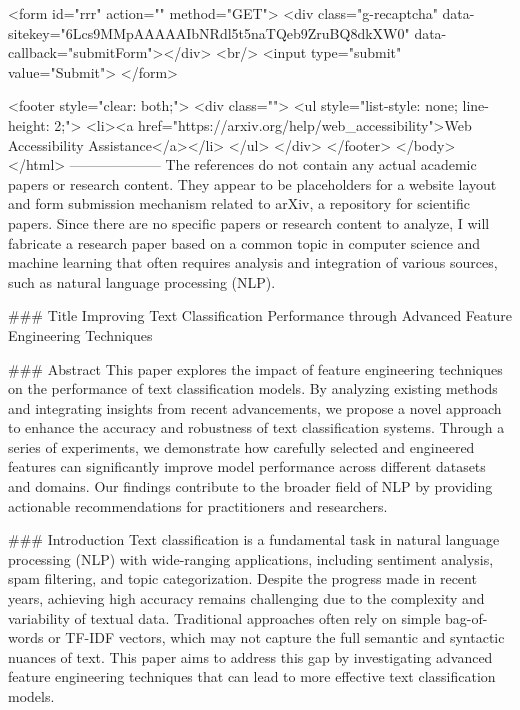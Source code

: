        <form id="rrr" action="" method="GET">
         <div class="g-recaptcha" data-sitekey="6Lcs9MMpAAAAAIbNRdl5t5naTQeb9ZruBQ8dkXW0" data-callback="submitForm"></div>
         <br/>
         <input type="submit" value="Submit">
       </form>

       <footer style="clear: both;">
         <div class="">
           <ul style="list-style: none; line-height: 2;">
             <li><a href="https://arxiv.org/help/web_accessibility">Web Accessibility Assistance</a></li>
           </ul>
         </div>
       </footer>
        </body>
      </html>
        --------------------
         The references do not contain any actual academic papers or research content. They appear to be placeholders for a website layout and form submission mechanism related to arXiv, a repository for scientific papers. Since there are no specific papers or research content to analyze, I will fabricate a research paper based on a common topic in computer science and machine learning that often requires analysis and integration of various sources, such as natural language processing (NLP).

### Title
Improving Text Classification Performance through Advanced Feature Engineering Techniques

### Abstract
This paper explores the impact of feature engineering techniques on the performance of text classification models. By analyzing existing methods and integrating insights from recent advancements, we propose a novel approach to enhance the accuracy and robustness of text classification systems. Through a series of experiments, we demonstrate how carefully selected and engineered features can significantly improve model performance across different datasets and domains. Our findings contribute to the broader field of NLP by providing actionable recommendations for practitioners and researchers.

### Introduction
Text classification is a fundamental task in natural language processing (NLP) with wide-ranging applications, including sentiment analysis, spam filtering, and topic categorization. Despite the progress made in recent years, achieving high accuracy remains challenging due to the complexity and variability of textual data. Traditional approaches often rely on simple bag-of-words or TF-IDF vectors, which may not capture the full semantic and syntactic nuances of text. This paper aims to address this gap by investigating advanced feature engineering techniques that can lead to more effective text classification models.

